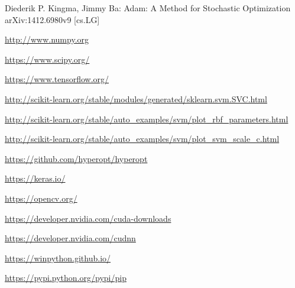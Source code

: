 \newpage
\begin{thebibliography}{99}
	Diederik P. Kingma, Jimmy Ba:
	Adam: A Method for Stochastic Optimization
	arXiv:1412.6980v9 [cs.LG]
	
	
	\url{http://www.numpy.org}
	
	
	\url{https://www.scipy.org/}
	
	
	\url{https://www.tensorflow.org/}
	
	\url{http://scikit-learn.org/stable/modules/generated/sklearn.svm.SVC.html}
	
	\url{http://scikit-learn.org/stable/auto_examples/svm/plot_rbf_parameters.html}
	
	\url{http://scikit-learn.org/stable/auto_examples/svm/plot_svm_scale_c.html}
	
	\url{https://github.com/hyperopt/hyperopt}
	
	\url{https://keras.io/}
	

	\url{https://opencv.org/}

	\url{https://developer.nvidia.com/cuda-downloads}



	\url{https://developer.nvidia.com/cudnn}

	\url{https://winpython.github.io/}
	
	
	\url{https://pypi.python.org/pypi/pip}
	

	
\end{thebibliography}





